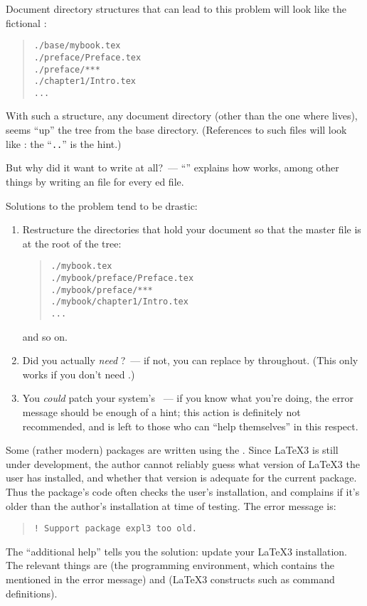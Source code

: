 {Document directory structures that can lead to this problem will look
like the fictional :
\begin{quote}
\begin{verbatim}
./base/mybook.tex
./preface/Preface.tex
./preface/***
./chapter1/Intro.tex
...
\end{verbatim}
\end{quote}
With such a structure, any document directory (other than the one
where  lives), seems ``up'' the tree from the
base directory.  (References to such files will look like
: the ``\texttt{..}'' is the
hint.)

But why did it want to write at all?~--- %
``'' explains
how  works, among other things by writing an
 file for every ed file.

Solutions to the problem tend to be drastic:
\begin{enumerate}
\item Restructure the directories that hold your document so that the
  master file is at the root of the tree:
  \begin{quote}
\begin{verbatim}
./mybook.tex
./mybook/preface/Preface.tex
./mybook/preface/***
./mybook/chapter1/Intro.tex
...
\end{verbatim}
  \end{quote}
  and so on.
\item Did you actually \emph{need} ?~--- if not, you can
  replace  by  throughout.  (This only works
  if you don't need .)
\item You \emph{could} patch your system's ~--- if you
  know what you're doing, the error message should be enough of a
  hint; this action is definitely not recommended, and is left to
  those who can ``help themselves'' in this respect.
\end{enumerate}


Some (rather modern) packages are written using the %
.  Since \LaTeX{}3
is still under development, the author cannot reliably guess what
version of \LaTeX{}3 the user has installed, and whether that version
is adequate for the current package.  Thus the package's code often
checks the user's installation, and complains if it's older than the
author's installation at time of testing.  The error message is:
\begin{quote}
\begin{verbatim}
! Support package expl3 too old.
\end{verbatim}
\end{quote}
The ``additional help'' tells you the solution: update your \LaTeX{}3
installation.  The relevant things are  (the
programming environment, which contains the  mentioned
in the error message) and  (\LaTeX{}3 constructs
such as command definitions).

}
